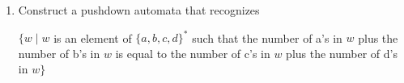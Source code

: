\documentclass{article}
\begin{document}
\begin{enumerate}
        \item Construct a pushdown automata that recognizes
            \begin{center}
                $\{w\mid w $ is an element of $\{a,b,c,d\}^* $ such that the number of a's in $w$ plus the number of b's in $w$ is equal to the number of c's in $w$ plus the number of d's in $w \}$
            \end{center}
    \end{enumerate}
\end{document}
